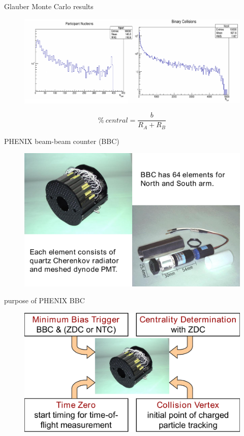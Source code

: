 \documentclass{beamer}
\begin{document}
\begin{frame}{Glauber Monte Carlo results}
  \begin{figure}
    \includegraphics[width=\textwidth]{plots/GMC_results.pdf}
  \end{figure}
  \begin{equation*}
    \% \:central=\frac{b}{R_A+R_B}
  \end{equation*}
\end{frame}


\begin{frame}{PHENIX beam-beam counter (BBC)}
  \begin{figure}
    \includegraphics[width=\textwidth]{plots/BBC_component.pdf}
  \end{figure}
\end{frame}


\begin{frame}{purpose of PHENIX BBC}
  \begin{figure}
    \includegraphics[width=\textwidth]{plots/PHENIX_BBC_purpose.pdf}
  \end{figure}
\end{frame}
\end{document}
